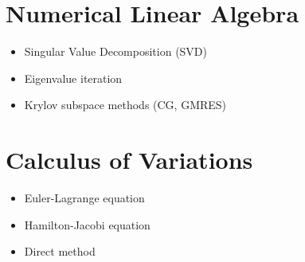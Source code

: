 \documentclass{amsart}
\begin{document}
\section{Numerical Linear Algebra}
\begin{itemize}
    \item Singular Value Decomposition (SVD)
    \item Eigenvalue iteration
    \item Krylov subspace methods (CG, GMRES)
\end{itemize}

\section{Calculus of Variations}
\begin{itemize}
    \item Euler-Lagrange equation
    \item Hamilton-Jacobi equation
    \item Direct method
\end{itemize}
\end{document}
